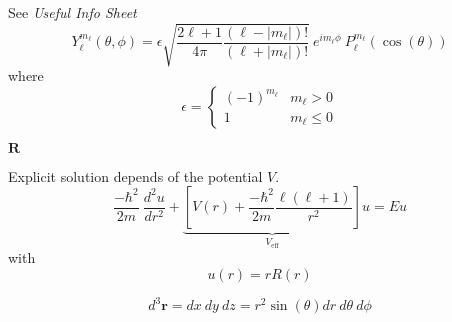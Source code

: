 
See \textit{Useful Info Sheet}
\begin{equation*}
    Y_{\ell}^{m_\ell}(\theta, \phi) = \epsilon\sqrt{\frac{2\ell+1}{4\pi}\frac{(\ell-|m_\ell|)!}{(\ell+|m_\ell|)!}}\:e^{im_\ell\phi}\:P_{\ell}^{m_\ell}(\cos(\theta))
\end{equation*}
where
\begin{equation*}
    \epsilon = \begin{cases}
        {(-1)}^{m_\ell} & m_\ell > 0    \\
        1               & m_\ell \leq 0
    \end{cases}
\end{equation*}

\newpar{}
 $\mathbf{R}$

Explicit solution depends of the potential $V$.
\begin{equation*}
    \frac{-\hbar^2}{2m}\:\frac{d^2u}{dr^2}+\underbrace{\left[V(r)+\frac{-\hbar^2}{2m}\frac{\ell(\ell+1)}{r^2}\right]}_{V_{\text{eff}}}u = Eu
\end{equation*}
with
\begin{equation*}
    u(r) = rR(r)
\end{equation*}

\begin{equation*}
    d^3\mathbf{r} = dx\:dy\:dz = r^2\sin(\theta)dr\:d\theta\:d\phi
\end{equation*}

